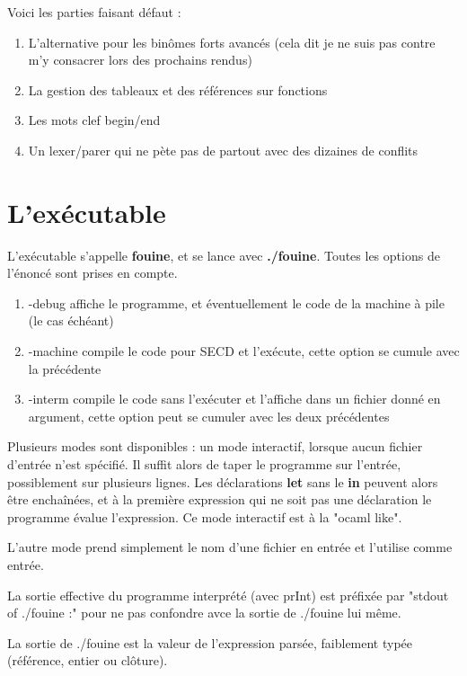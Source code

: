 \documentclass[a4paper,10pt]{report}
\begin{document}
Voici les parties faisant défaut :
\begin{enumerate}
\item L'alternative pour les binômes forts avancés (cela dit je ne suis pas contre m'y consacrer lors des prochains rendus)
\item La gestion des tableaux et des références sur fonctions
\item Les mots clef begin/end
\item Un lexer/parer qui ne pète pas de partout avec des dizaines de conflits
\end{enumerate}

\section{L'exécutable}

L'exécutable s'appelle \textbf{fouine}, et se lance avec \textbf{./fouine}.
Toutes les options de l'énoncé sont prises en compte.  

\begin{enumerate}
\item -debug affiche le programme, et éventuellement le code de la machine à pile (le cas échéant)
\item -machine compile le code pour SECD et l'exécute, cette option se cumule avec la précédente
\item -interm compile le code sans l'exécuter et l'affiche dans un fichier donné en argument, cette option peut se cumuler avec les deux précédentes
\end{enumerate}
  
Plusieurs modes sont disponibles : un mode interactif, lorsque aucun fichier d'entrée n'est spécifié.  
Il suffit alors de taper le programme sur l'entrée, possiblement sur plusieurs lignes. Les déclarations \textbf{let} sans le \textbf{in} peuvent alors être enchaînées, et à la première expression qui ne soit pas une déclaration le programme évalue l'expression. Ce mode interactif est à la "ocaml like".  
  
L'autre mode prend simplement le nom d'une fichier en entrée et l'utilise comme entrée.  
  
La sortie effective du programme interprété (avec prInt) est préfixée par "stdout of ./fouine :" pour ne pas confondre avce la sortie de ./fouine lui même.  
  
La sortie de ./fouine est la valeur de l'expression parsée, faiblement typée (référence, entier ou clôture).
\end{document}
